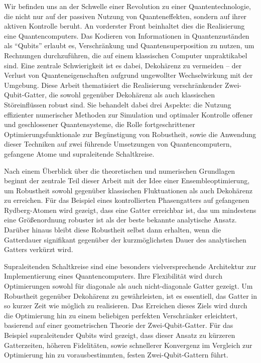 
Wir befinden uns an der Schwelle einer Revolution zu einer Quantentechnologie,
die nicht nur auf der passiven Nutzung von Quanteneffekten, sondern auf ihrer
aktiven Kontrolle beruht. An vorderster Front beinhaltet dies die Realisierung
eine Quantencomputers. Das Kodieren von Informationen in Quantenzuständen als
``Qubits'' erlaubt es, Verschränkung und Quantensuperposition zu nutzen, um
Rechnungen durchzuführen, die auf einem klassischen Computer unpraktikabel sind.
Eine zentrale Schwierigkeit ist es dabei, Dekohärenz zu vermeiden -- der Verlust
von Quanteneigenschaften aufgrund ungewollter Wechselwirkung mit der Umgebung.
Diese Arbeit thematisiert die Realisierung verschränkender Zwei-Qubit-Gatter,
die sowohl gegenüber Dekohärenz als auch klassischen Störeinflüssen robust sind.
Sie behandelt dabei drei Aspekte: die Nutzung effizienter numerischer Methoden
zur Simulation und optimaler Kontrolle offener und geschlossener
Quantensysteme, die Rolle fortgeschrittener Optimierungsfunktionale zur
Begünstigung von Robustheit, sowie die Anwendung dieser Techniken auf zwei
führende Umsetzungen von Quantencomputern, gefangene Atome und
supraleitende Schaltkreise.

Nach einem Überblick über die theoretischen und numerischen
Grundlagen beginnt der zentrale Teil dieser Arbeit mit der Idee einer
Ensembleoptimierung, um Robustheit sowohl gegenüber klassischen Fluktuationen als
auch Dekohärenz zu erreichen. Für das Beispiel eines kontrollierten
Phasengatters auf gefangenen Rydberg-Atomen wird gezeigt, dass eine Gatter
erreichbar ist, das um mindestens eine Größenordnung robuster ist als der beste
bekannte analytische Ansatz. Darüber hinaus bleibt diese Ro\/bust\/heit selbst dann
erhalten, wenn die Gatterdauer signifikant gegenüber der kurzmöglichsten Dauer
des analytischen Gatters verkürzt wird.

Supraleitenden Schaltkreise sind eine besonders vielversprechende Architektur
zur Implementierung eines Quantencomputers. Ihre Flexibilität wird durch
Optimierungen sowohl für diagonale als auch nicht-diagonale Gatter gezeigt. Um
Robustheit gegenüber Dekohärenz zu gewährleisten, ist es essentiell, das Gatter
in so kurzer Zeit wie möglich zu realisieren. Das Erreichen dieses Ziels wird
durch die Optimierung hin zu einem beliebigen perfekten Verschränker
erleichtert, basierend auf einer geometrischen Theorie der Zwei-Qubit-Gatter.
Für das Beispiel supraleitender Qubits wird gezeigt, dass dieser Ansatz zu
kürzeren Gatterzeiten, höheren Fidelitäten, sowie schnellerer Konvergenz im
Vergleich zur Optimierung hin zu vorausbestimmten, festen Zwei-Qubit-Gattern
führt.

